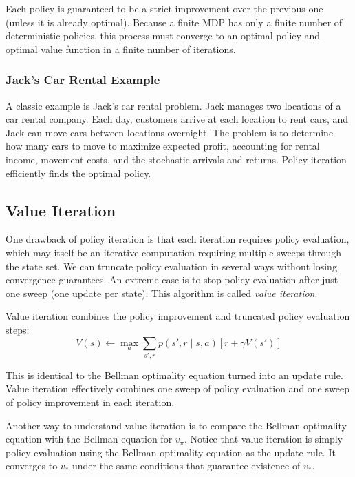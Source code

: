 \documentclass[12pt]{article}
\begin{document}
Each policy is guaranteed to be a strict improvement over the previous one (unless it is already optimal). Because a finite MDP has only a finite number of deterministic policies, this process must converge to an optimal policy and optimal value function in a finite number of iterations.

\subsubsection{Jack's Car Rental Example}

A classic example is Jack's car rental problem. Jack manages two locations of a car rental company. Each day, customers arrive at each location to rent cars, and Jack can move cars between locations overnight. The problem is to determine how many cars to move to maximize expected profit, accounting for rental income, movement costs, and the stochastic arrivals and returns. Policy iteration efficiently finds the optimal policy.

\subsection{Value Iteration}

One drawback of policy iteration is that each iteration requires policy evaluation, which may itself be an iterative computation requiring multiple sweeps through the state set. We can truncate policy evaluation in several ways without losing convergence guarantees. An extreme case is to stop policy evaluation after just one sweep (one update per state). This algorithm is called \textit{value iteration}.

Value iteration combines the policy improvement and truncated policy evaluation steps:
\begin{equation}
V(s) \leftarrow \max_a \sum_{s', r} p(s', r \mid s, a)[r + \gamma V(s')]
\end{equation}

This is identical to the Bellman optimality equation turned into an update rule. Value iteration effectively combines one sweep of policy evaluation and one sweep of policy improvement in each iteration.

Another way to understand value iteration is to compare the Bellman optimality equation with the Bellman equation for $v_\pi$. Notice that value iteration is simply policy evaluation using the Bellman optimality equation as the update rule. It converges to $v_*$ under the same conditions that guarantee existence of $v_*$.
\end{document}
